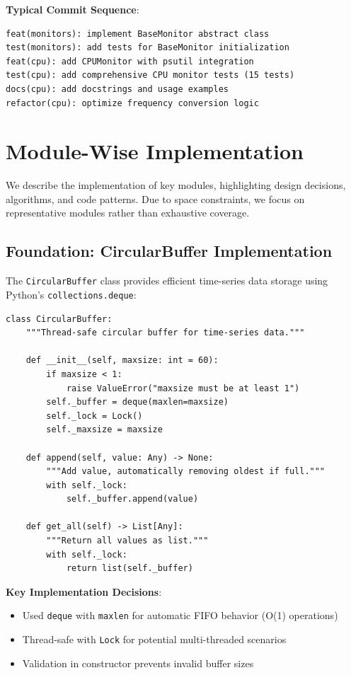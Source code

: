 \documentclass[12pt,a4paper,oneside]{report}
\begin{document}
\textbf{Typical Commit Sequence}:
\begin{verbatim}
feat(monitors): implement BaseMonitor abstract class
test(monitors): add tests for BaseMonitor initialization
feat(cpu): add CPUMonitor with psutil integration
test(cpu): add comprehensive CPU monitor tests (15 tests)
docs(cpu): add docstrings and usage examples
refactor(cpu): optimize frequency conversion logic
\end{verbatim}

\section{Module-Wise Implementation}
\label{sec:module-implementation}

We describe the implementation of key modules, highlighting design decisions, algorithms, and code patterns. Due to space constraints, we focus on representative modules rather than exhaustive coverage.

\subsection{Foundation: CircularBuffer Implementation}

The \texttt{CircularBuffer} class provides efficient time-series data storage using Python's \texttt{collections.deque}:

\begin{lstlisting}
class CircularBuffer:
    """Thread-safe circular buffer for time-series data."""
    
    def __init__(self, maxsize: int = 60):
        if maxsize < 1:
            raise ValueError("maxsize must be at least 1")
        self._buffer = deque(maxlen=maxsize)
        self._lock = Lock()
        self._maxsize = maxsize
    
    def append(self, value: Any) -> None:
        """Add value, automatically removing oldest if full."""
        with self._lock:
            self._buffer.append(value)
    
    def get_all(self) -> List[Any]:
        """Return all values as list."""
        with self._lock:
            return list(self._buffer)
\end{lstlisting}

\textbf{Key Implementation Decisions}:
\begin{itemize}
    \item Used \texttt{deque} with \texttt{maxlen} for automatic FIFO behavior (O(1) operations)
    \item Thread-safe with \texttt{Lock} for potential multi-threaded scenarios
    \item Validation in constructor prevents invalid buffer sizes
\end{itemize}
\end{document}
